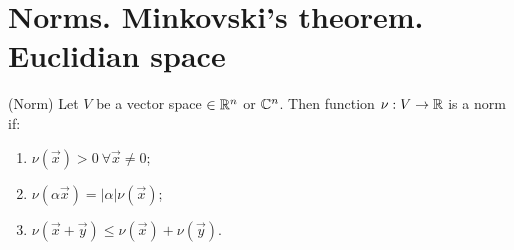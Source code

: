 \section{Norms. Minkovski's theorem. Euclidian space}
\begin{definition}{(Norm)}{}
    Let $V$ be a vector space $\in \mathbb{R}^n$ or $\mathbb{C}^n$. Then function $\nu : V \to \mathbb{R}$ is a norm if:
    \begin{enumerate}
        \item $\nu(\vec{x}) > 0 \ \forall \vec{x} \neq 0$;
        \item $\nu(\alpha \vec{x}) = |\alpha| \nu(\vec{x})$;
        \item $\nu(\vec{x} + \vec{y}) \leq \nu(\vec{x}) + \nu(\vec{y})$. 
    \end{enumerate}
\end{definition}

\begin{theorema}{}{}

\end{theorema}